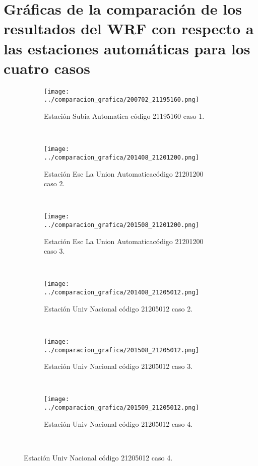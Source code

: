 \chapter{Gráficas de la comparación de los resultados del WRF con respecto a las estaciones automáticas para los cuatro casos}



\label{anexo:graficas_temperatura}
\newpage

\begin{figure}[H]
    
\begin{subfigure}[normla]{0.4\textwidth}
\caption{Estación Subia Automatica código 21195160 caso 1.}
\texttt{[image: ../comparacion\_grafica/200702\_21195160.png]}
\end{subfigure}
~
\begin{subfigure}[normla]{0.4\textwidth}
\caption{Estación Esc La Union Automaticacódigo 21201200 caso 2.}
\texttt{[image: ../comparacion\_grafica/201408\_21201200.png]}
\end{subfigure}
~
\begin{subfigure}[normla]{0.4\textwidth}
\caption{Estación Esc La Union Automaticacódigo 21201200 caso 3.}
\texttt{[image: ../comparacion\_grafica/201508\_21201200.png]}
\end{subfigure}
~
\begin{subfigure}[normla]{0.4\textwidth}
\caption{Estación Univ Nacional código 21205012 caso 2.}
\texttt{[image: ../comparacion\_grafica/201408\_21205012.png]}
\end{subfigure}
~
\begin{subfigure}[normla]{0.4\textwidth}
\caption{Estación Univ Nacional código 21205012 caso 3.}
\texttt{[image: ../comparacion\_grafica/201508\_21205012.png]}
\end{subfigure}
~
\begin{subfigure}[normla]{0.4\textwidth}
\caption{Estación Univ Nacional código 21205012 caso 4.}
\texttt{[image: ../comparacion\_grafica/201509\_21205012.png]}
\end{subfigure}
~
\end{figure}
           
